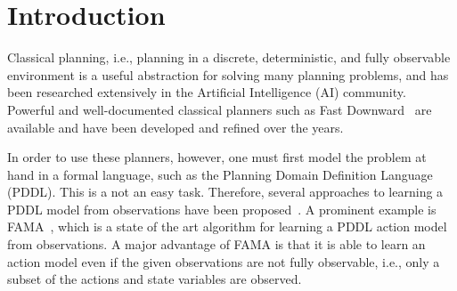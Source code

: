 \documentclass[letterpaper]{article} %
\begin{document}
\begin{abstract}




\end{abstract}

\section{Introduction} 

Classical planning, i.e., planning in a discrete, deterministic, and fully observable environment is a useful abstraction for solving many planning problems, and has been researched extensively in the Artificial Intelligence (AI) community. Powerful and well-documented classical planners such as Fast Downward~\cite{helmert2006fast} are available and have been developed and refined over the years.


In order to use these planners, however, one must first model the problem at hand in a formal language, such as the Planning Domain Definition Language (PDDL). This is a not an easy task. 
Therefore, several approaches to learning a PDDL model from observations have been proposed~\cite{aineto2019learning,stern2017efficientAndSafe,juba2021safe,cresswell2013acquiring,wu2007arms}. 
A prominent example is FAMA~\cite{aineto2019learning}, which is a state of the art algorithm for learning a PDDL action model from observations. A major advantage of FAMA is that it is able to learn an action model even if the given observations are not fully observable, i.e., only a subset of the actions and state variables are observed. 
\end{document}
